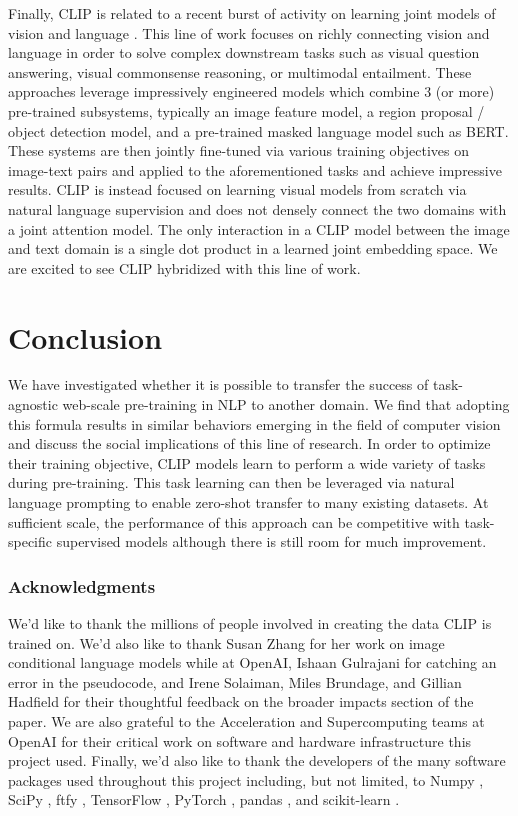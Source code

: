 Finally, CLIP is related to a recent burst of activity on learning joint models of vision and language \citep{lu2019vilbert,tan2019lxmert,chen2019uniter,li2020oscar,yu2020ernie}. This line of work focuses on richly connecting vision and language in order to solve complex downstream tasks such as visual question answering, visual commonsense reasoning, or multimodal entailment. These approaches leverage impressively engineered models which combine 3 (or more) pre-trained subsystems, typically an image feature model, a region proposal / object detection model, and a pre-trained masked language model such as BERT. These systems are then jointly fine-tuned via various training objectives on image-text pairs and applied to the aforementioned tasks and achieve impressive results. CLIP is instead focused on learning visual models from scratch via natural language supervision and does not densely connect the two domains with a joint attention model. The only interaction in a CLIP model between the image and text domain is a single dot product in a learned joint embedding space. We are excited to see CLIP hybridized with this line of work.

\section{Conclusion}

We have investigated whether it is possible to transfer the success of task-agnostic web-scale pre-training in NLP to another domain. We find that adopting this formula results in similar behaviors emerging in the field of computer vision and discuss the social implications of this line of research. In order to optimize their training objective, CLIP models learn to perform a wide variety of tasks during pre-training. This task learning can then be leveraged via natural language prompting to enable zero-shot transfer to many existing datasets. At sufficient scale, the performance of this approach can be competitive with task-specific supervised models although there is still room for much improvement.

\subsubsection*{Acknowledgments}
We'd like to thank the millions of people involved in creating the data CLIP is trained on. We'd also like to thank Susan Zhang for her work on image conditional language models while at OpenAI, Ishaan Gulrajani for catching an error in the pseudocode, and Irene Solaiman, Miles Brundage, and Gillian Hadfield for their thoughtful feedback on the broader impacts section of the paper. We are also grateful to the Acceleration and Supercomputing teams at OpenAI for their critical work on software and hardware infrastructure this project used. Finally, we'd also like to thank the developers of the many software packages used throughout this project including, but not limited, to Numpy \citep{2020NumPy-Array}, SciPy \citep{2020SciPy-NMeth}, ftfy \citep{speer-2019-ftfy}, TensorFlow \citep{abadi2016tensorflow}, PyTorch \citep{NEURIPS2019_9015}, pandas \citep{reback2020pandas}, and scikit-learn \citep{scikit-learn}.


